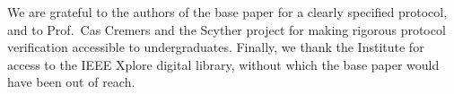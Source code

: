 \vspace{2mm}\noindent
We are grateful to the authors of the base paper for a clearly specified protocol, and to
Prof.\ Cas Cremers and the Scyther project for making rigorous protocol verification
accessible to undergraduates. Finally, we thank the Institute for access to the IEEE Xplore
digital library, without which the base paper would have been out of reach.

\cleardoublepage
{}
\tableofcontents
\listoffigures
{}
\listoftables
{}
\cleardoublepage
